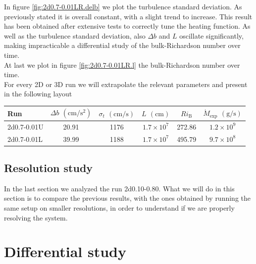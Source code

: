   In figure \ref{fig:2d0.7-0.01LR.delb} we plot the turbulence standard deviation. As previously stated it is overall constant, with a slight trend to increase. This result has been obtained after extensive tests to correctly tune the heating function. As well as the turbulence standard deviation, also $\Delta b$ and $L$ oscillate significantly, making impracticable a differential study of the bulk-Richardson number over time.\\
At last we plot in figure \ref{fig:2d0.7-0.01LR.l} the bulk-Richardson number over time.\\
For every 2D or 3D run we will extrapolate the relevant parameters and present in the following layout
\begin{center}
 \begin{tabular}{l|c|c|c|c|c}
	 Run & $\Delta b$  $(\mathrm{cm/s^{2}})$ & $\sigma_t$ $(\mathrm{cm/s})$ & $L$ $(\mathrm{cm})$ & $Ri_{\mathrm{B}}$ & $\dot{M}_{\mathrm{exp}}$ $(\mathrm{g/s})$\\
	  	\hline
		2d0.7-0.01U & 20.91 & 1176 & $1.7 \times 10^{7}$ & 272.86  & $1.2 \times 10^{9}$ \\
		\hline
		2d0.7-0.01L & 39.99 & 1188 & $1.7 \times 10^{7}$ & 495.79& $9.7 \times 10^{8}$ \\ 
      \end{tabular}
 \end{center}

\subsection{Resolution study}
In the last section we analyzed the run 2d0.10-0.80. What we will do in this section is to compare the previous results, with the ones obtained by running the same setup on smaller resolutions, in order to understand if we are properly resolving the system. \\
\section{Differential study}
